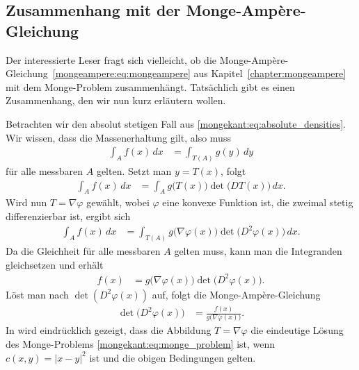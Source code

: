 \subsection{Zusammenhang mit der Monge-Ampère-Gleichung}
Der interessierte Leser fragt sich vielleicht,
ob die Monge-Ampère-Gleichung~\eqref{mongeampere:eq:mongeampere}
aus Kapitel~\ref{chapter:mongeampere}
mit dem Monge-Problem zusammenhängt.
Tatsächlich gibt es einen Zusammenhang,
den wir nun kurz erläutern wollen.

Betrachten wir den absolut stetigen Fall aus \eqref{mongekant:eq:absolute_densities}.
Wir wissen,
dass die Massenerhaltung gilt,
also muss
\begin{align*}
\int_{A} f(x) \, dx
&=
\int_{T(A)} g(y) \, dy
\end{align*}
für alle messbaren $A$ gelten.
Setzt man $y = T(x)$,
folgt
\begin{align*}
\int_{A} f(x) \, dx
&=
\int_{A} g \bigl(T(x)\bigr) \det \bigl(DT(x)\bigr) \, dx
.
\end{align*}
Wird nun $T = \nabla \varphi$ gewählt,
wobei $\varphi$ eine konvexe Funktion ist,
die zweimal stetig differenzierbar ist,
ergibt sich
\begin{align*}
\int_{A} f(x) \, dx
&=
\int_{T(A)} g\bigl(\nabla \varphi(x)\bigr) \det\bigl(D^2 \varphi(x)\bigr) \, dx
.
\end{align*}
Da die Gleichheit für alle messbaren $A$ gelten muss,
kann man die Integranden gleichsetzen und erhält
\begin{align*}
f(x)
&=
g\bigl(\nabla \varphi(x)\bigr) \det\bigl(D^2 \varphi(x)\bigr)
.
\end{align*}
Löst man nach $\det(D^2 \varphi(x))$ auf,
folgt die Monge-Ampère-Gleichung
\begin{align*}
\det\bigl(D^2 \varphi(x)\bigr)
&=
\frac{f(x)}{g\bigl(\nabla \varphi(x)\bigr)}
.
\end{align*}
In \cite{mongekant:brenier} wird eindrücklich gezeigt,
dass die Abbildung $T = \nabla \varphi$
die eindeutige Lösung des Monge-Problems \eqref{mongekant:eq:monge_problem} ist,
wenn $c(x,y) = \left\lvert x - y\right\rvert^2$ ist und die obigen Bedingungen gelten.

